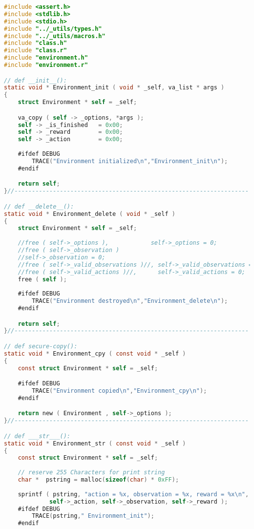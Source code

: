 \documentclass[fancychapters]{report}   	%
\begin{document}
\begin{lstlisting}[language=C,caption={environment.c}]
#include <assert.h>
#include <stdlib.h>
#include <stdio.h>
#include "../_utils/types.h"
#include "../_utils/macros.h"
#include "class.h"
#include "class.r"
#include "environment.h"
#include "environment.r"

// def __init__():
static void * Environment_init ( void * _self, va_list * args )
{
    struct Environment * self = _self;

    va_copy ( self -> _options, *args );
    self -> _is_finished   = 0x00;
    self -> _reward        = 0x00;
    self -> _action        = 0x00;
    
    #ifdef DEBUG 
        TRACE("Environment initialized\n","Environment_init\n");
    #endif

    return self;
}//-------------------------------------------------------------------

// def __delete__():
static void * Environment_delete ( void * _self )
{
    struct Environment * self = _self;
    
    //free ( self->_options ),            self->_options = 0;
    //free ( self->_observation )
    //self->_observation = 0;
    //free ( self->_valid_observations )//, self->_valid_observations = 0;
    //free ( self->_valid_actions )//,      self->_valid_actions = 0;
    free ( self );
    
    #ifdef DEBUG 
        TRACE("Environment destroyed\n","Environment_delete\n");
    #endif

    return self;
}//-------------------------------------------------------------------

// def secure-copy():
static void * Environment_cpy ( const void * _self )
{
    const struct Environment * self = _self;

    #ifdef DEBUG 
        TRACE("Environment copied\n","Environment_cpy\n");
    #endif

    return new ( Environment , self->_options );
}//-------------------------------------------------------------------

// def ___str___():
static void * Environment_str ( const void * _self )
{
    const struct Environment * self = _self;
    
    // reserve 255 Characters for print string
    char *  pstring = malloc(sizeof(char) * 0xFF);
    
    sprintf ( pstring, "action = %x, observation = %x, reward = %x\n",
             self->_action, self->_observation, self->_reward );
    #ifdef DEBUG 
        TRACE(pstring," Environment_init");
    #endif
    

\end{lstlisting}
\end{document}
